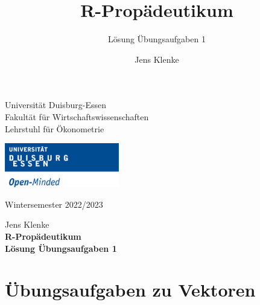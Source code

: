 \documentclass[12pt,a4paper]{article}
\title{R-Propädeutikum}
\subtitle{Lösung Übungsaufgaben 1}
\author{Jens Klenke}
\date{}
\begin{document}





\restoregeometry



\begin{minipage}{0.6\textwidth}
Universität Duisburg-Essen\\
Fakultät für Wirtschaftswissenschaften\\
Lehrstuhl für Ökonometrie\\
\end{minipage}

	\begin{flushright}
	\vspace{-3cm}
	\includegraphics*[width=5cm]{includes/duelogo_en.png}\\
	\vspace{.125cm}
	\end{flushright}
\hspace{-0.005cm}Wintersemester 2022/2023

\vspace{0.05cm}

\begin{center}
	\vspace{.25cm}
	Jens Klenke \hspace{.5cm}  \\
	\vspace{.25cm}
	\textbf{\Large{R-Propädeutikum}}\\
	\vspace{.25cm}
	\textbf{\large{Lösung Übungsaufgaben 1}}\\
	\vspace{.125cm}
\end{center}





\hypertarget{uxfcbungsaufgaben-zu-vektoren}{%
\section{Übungsaufgaben zu
Vektoren}\label{uxfcbungsaufgaben-zu-vektoren}}
\end{document}
